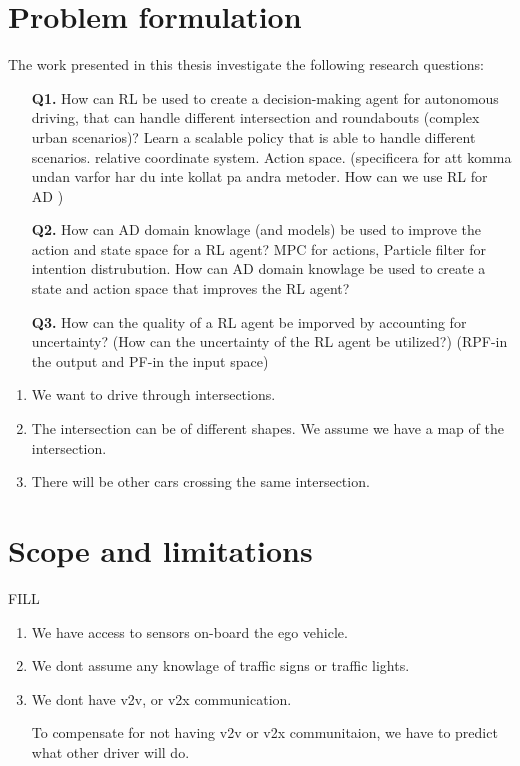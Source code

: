 \section{Problem formulation}
The work presented in this thesis investigate the following research questions:
\begin{enumerate}
	\item[\textbf{Q1.}] How can RL be used to create a decision-making agent for autonomous driving, that can handle different intersection and roundabouts (complex urban scenarios)? Learn a scalable policy that is able to handle different scenarios. relative coordinate system. Action space. 
	(specificera for att komma undan varfor har du inte kollat pa andra metoder. How can we use RL for AD )
	\item[\textbf{Q2.}] How can AD domain knowlage (and models) be used to improve the action and state space for a RL agent? MPC for actions, Particle filter for intention distrubution. How can AD domain knowlage be used to create a state and action space that improves the RL agent?
	\item[\textbf{Q3.}] How can the quality of a RL agent be imporved by accounting for uncertainty?
	(How can the uncertainty of the RL agent be utilized?) (RPF-in the output and PF-in the input space)
\end{enumerate}



\begin{enumerate}
	\item We want to drive through intersections. 
	\item The intersection can be of different shapes. We assume we have a map of the intersection. 
	\item There will be other cars crossing the same intersection. 
	
\end{enumerate}



\section{Scope and limitations}
FILL
\begin{enumerate}
	\item We have access to sensors on-board the ego vehicle. 
	\item We dont assume any knowlage of traffic signs or traffic lights. 
	\item We dont have v2v, or v2x communication. 
	
	To compensate for not having v2v or v2x communitaion, we have to predict what other driver will do. 
	
\end{enumerate}
